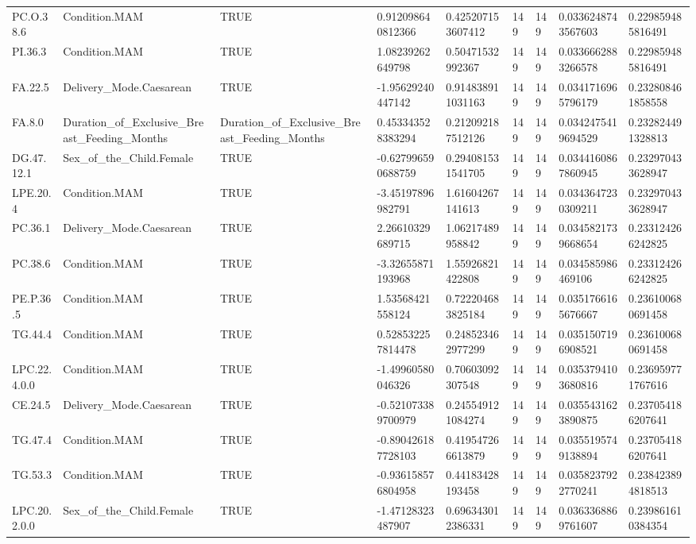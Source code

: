 \begin{longtable}{lllllllll}
PC.O.38.6 & Condition.MAM & TRUE & 0.912098640812366 & 0.425207153607412 & 149 & 149 & 0.0336248743567603 & 0.229859485816491 \\
PI.36.3 & Condition.MAM & TRUE & 1.08239262649798 & 0.50471532992367 & 149 & 149 & 0.0336662883266578 & 0.229859485816491 \\
FA.22.5 & Delivery\_Mode.Caesarean & TRUE & -1.95629240447142 & 0.914838911031163 & 149 & 149 & 0.0341716965796179 & 0.232808461858558 \\
FA.8.0 & Duration\_of\_Exclusive\_Breast\_Feeding\_Months & Duration\_of\_Exclusive\_Breast\_Feeding\_Months & 0.453343528383294 & 0.212092187512126 & 149 & 149 & 0.0342475419694529 & 0.232824491328813 \\
DG.47.12.1 & Sex\_of\_the\_Child.Female & TRUE & -0.627996590688759 & 0.294081531541705 & 149 & 149 & 0.0344160867860945 & 0.232970433628947 \\
LPE.20.4 & Condition.MAM & TRUE & -3.45197896982791 & 1.61604267141613 & 149 & 149 & 0.0343647230309211 & 0.232970433628947 \\
PC.36.1 & Delivery\_Mode.Caesarean & TRUE & 2.26610329689715 & 1.06217489958842 & 149 & 149 & 0.0345821739668654 & 0.233124266242825 \\
PC.38.6 & Condition.MAM & TRUE & -3.32655871193968 & 1.55926821422808 & 149 & 149 & 0.034585986469106 & 0.233124266242825 \\
PE.P.36.5 & Condition.MAM & TRUE & 1.53568421558124 & 0.722204683825184 & 149 & 149 & 0.0351766165676667 & 0.236100680691458 \\
TG.44.4 & Condition.MAM & TRUE & 0.528532257814478 & 0.248523462977299 & 149 & 149 & 0.0351507196908521 & 0.236100680691458 \\
LPC.22.4.0.0 & Condition.MAM & TRUE & -1.49960580046326 & 0.70603092307548 & 149 & 149 & 0.0353794103680816 & 0.236959771767616 \\
CE.24.5 & Delivery\_Mode.Caesarean & TRUE & -0.521073389700979 & 0.245549121084274 & 149 & 149 & 0.0355431623890875 & 0.237054186207641 \\
TG.47.4 & Condition.MAM & TRUE & -0.890426187728103 & 0.419547266613879 & 149 & 149 & 0.0355195749138894 & 0.237054186207641 \\
TG.53.3 & Condition.MAM & TRUE & -0.936158576804958 & 0.44183428193458 & 149 & 149 & 0.0358237922770241 & 0.238423894818513 \\
LPC.20.2.0.0 & Sex\_of\_the\_Child.Female & TRUE & -1.47128323487907 & 0.696343012386331 & 149 & 149 & 0.0363368869761607 & 0.239861610384354 \\

\end{longtable}
